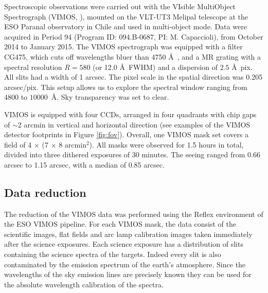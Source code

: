 \documentclass[useAMS,usenatbib]{mn2e}
\begin{document}
Spectroscopic observations were carried out with the VIsible MultiObject 
Spectrograph (VIMOS, \citealt{LeFevre}), mounted on the VLT-UT3 Melipal 
telescope at the ESO Paranal observatory in Chile and used in multi-object 
mode. Data were acquired in Period 94 (Program ID: 094.B-0687, 
PI: M. Capaccioli), from October 2014 to January 2015. 
The VIMOS spectrograph was equipped with a filter CG475, which cuts off 
wavelengths bluer than 4750 \AA\ , and a MR grating with a spectral resolution 
$R = 580$ (or 12.0 \AA\ FWHM) 
and a dispersion of $2.5$ \AA\/~pix. All slits had a width of 1 arcsec. The 
pixel scale in the spatial direction was 0.205 arcsec/pix. This setup allows us 
to explore the spectral window ranging from $4800$ to $10000$~\AA. Sky 
transparency was set to clear.

VIMOS is equipped with four CCDs, arranged in four quadrants with chip gaps of 
$\sim$2 arcmin in vertical and horizontal direction (see examples of the VIMOS 
detector footprints in Figure \ref{fig:fov}). Overall, one VIMOS mask set 
covers a field of 4 $\times$ (7 $\times$ 8 arcmin$^2$). All masks were observed 
for 1.5 hours in total, divided into three dithered exposures of 30 minutes. 
The seeing ranged from 0.66 arcsec to 1.15 arcsec, with a median of 0.85 arcsec. 

\subsection{Data reduction}

The reduction of the VIMOS data was performed using the Reflex 
environment \citep{Freudling13} of the ESO VIMOS pipeline. 
For each VIMOS mask, the data consist of the scientific images, flat fields and
arc lamp calibration images taken immediately after the science 
exposures. Each science exposure has a distribution of slits containing the 
science spectra of the targets. Indeed every slit is also contaminated by the 
emission spectrum of the earth's atmosphere. Since the wavelengths of the 
sky emission lines are precisely known they can be used for the absolute 
wavelength calibration of the spectra.
\end{document}
